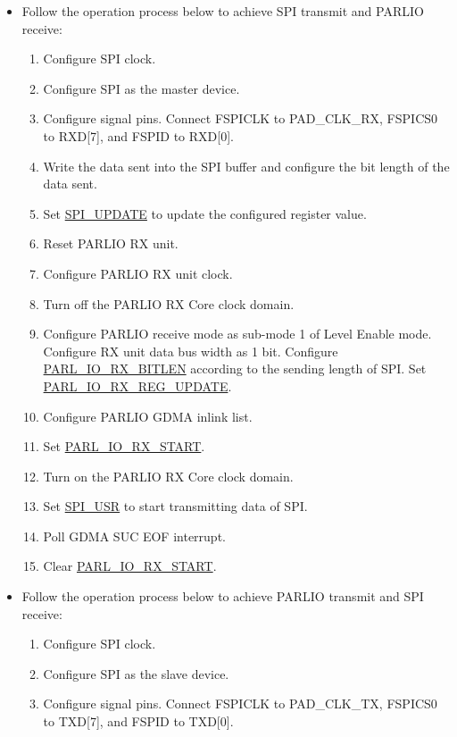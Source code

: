 \documentclass[main\_\_EN.tex]{subfiles}
\begin{document}
\begin{itemize}
    \item Follow the operation process below to achieve SPI transmit and PARLIO receive:
    \begin{enumerate}
        \item Configure SPI clock.
        \item Configure SPI as the master device.
        \item Configure signal pins. Connect FSPICLK to PAD\_CLK\_RX, FSPICS0 to RXD[7], and FSPID to RXD[0]. 
        \item Write the data sent into the SPI buffer and configure the bit length of the data sent.
        \item Set \hyperref[fielddesc:SPIUPDATE]{SPI\_UPDATE} to update the configured register value.
        \item Reset PARLIO RX unit.
        \item Configure PARLIO RX unit clock.
        \item Turn off the PARLIO RX Core clock domain.
        \item Configure PARLIO receive mode as sub-mode 1 of Level Enable mode. Configure RX unit data bus width as 1 bit. Configure \hyperref[fielddesc:PARLIORXBITLEN]{PARL\_IO\_RX\_BITLEN} according to the sending length of SPI. Set \hyperref[fielddesc:PARLIORXREGUPDATE]{PARL\_IO\_RX\_REG\_UPDATE}.
        \item Configure PARLIO GDMA inlink list.
        \item Set \hyperref[fielddesc:PARLIORXSTART]{PARL\_IO\_RX\_START}.
        \item Turn on the PARLIO RX Core clock domain.
        \item Set \hyperref[fielddesc:SPIUSR]{SPI\_USR} to start transmitting data of SPI.
        \item Poll GDMA SUC EOF interrupt.
        \item Clear \hyperref[fielddesc:PARLIORXSTART]{PARL\_IO\_RX\_START}.  
    \end{enumerate} 
    \item Follow the operation process below to achieve PARLIO transmit and SPI receive:
    \begin{enumerate}
        \item Configure SPI clock.
        \item Configure SPI as the slave device.
        \item Configure signal pins. Connect FSPICLK to PAD\_CLK\_TX, FSPICS0 to TXD[7], and FSPID to TXD[0]. 

\end{enumerate}
\end{itemize}
\end{document}
